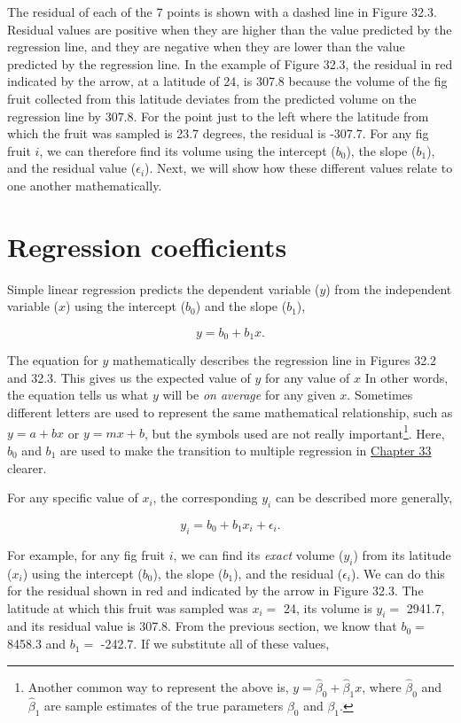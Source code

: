 \documentclass[
]{scrbook}
\begin{document}
The residual of each of the 7 points is shown with a dashed line in Figure 32.3.
Residual values are positive when they are higher than the value predicted by the regression line, and they are negative when they are lower than the value predicted by the regression line.
In the example of Figure 32.3, the residual in red indicated by the arrow, at a latitude of 24, is 307.8 because the volume of the fig fruit collected from this latitude deviates from the predicted volume on the regression line by 307.8.
For the point just to the left where the latitude from which the fruit was sampled is 23.7 degrees, the residual is -307.7.
For any fig fruit \(i\), we can therefore find its volume using the intercept (\(b_{0}\)), the slope (\(b_{1}\)), and the residual value (\(\epsilon_{i}\)).
Next, we will show how these different values relate to one another mathematically.

\hypertarget{regression-coefficients}{%
\section{Regression coefficients}\label{regression-coefficients}}

Simple linear regression predicts the dependent variable (\(y\)) from the independent variable (\(x\)) using the intercept (\(b_{0}\)) and the slope (\(b_{1}\)),

\[y = b_{0} + b_{1}x.\]

The equation for \(y\) mathematically describes the regression line in Figures 32.2 and 32.3.
This gives us the expected value of \(y\) for any value of \(x\)
In other words, the equation tells us what \(y\) will be \emph{on average} for any given \(x\).
Sometimes different letters are used to represent the same mathematical relationship, such as \(y = a + bx\) or \(y = mx + b\), but the symbols used are not really important\footnote{Another common way to represent the above is, \(y = \hat{\beta}_{0} + \hat{\beta}_{1}x\), where \(\hat{\beta}_{0}\) and \(\hat{\beta}_{1}\) are sample estimates of the true parameters \({\beta}_{0}\) and \({\beta}_{1}\).}.
Here, \(b_{0}\) and \(b_{1}\) are used to make the transition to multiple regression in \protect\hyperlink{Chapter_33}{Chapter 33} clearer.

For any specific value of \(x_{i}\), the corresponding \(y_{i}\) can be described more generally,

\[y_{i} = b_{0} + b_{1}x_{i} + \epsilon_{i}.\]

For example, for any fig fruit \(i\), we can find its \emph{exact} volume (\(y_{i}\)) from its latitude (\(x_{i}\)) using the intercept (\(b_{0}\)), the slope (\(b_{1}\)), and the residual (\(\epsilon_{i}\)).
We can do this for the residual shown in red and indicated by the arrow in Figure 32.3.
The latitude at which this fruit was sampled was \(x_{i} =\) 24, its volume is \(y_{i} =\) 2941.7, and its residual value is 307.8.
From the previous section, we know that \(b_{0} =\) 8458.3 and \(b_{1} =\) -242.7.
If we substitute all of these values,
\end{document}
